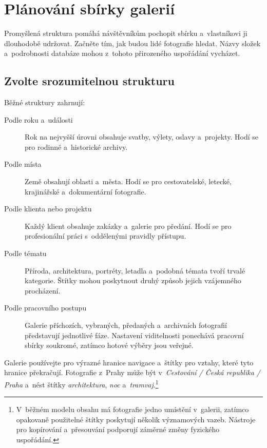 \documentclass[11pt,a4paper]{article}
\begin{document}
\section{Plánování sbírky galerií}
\label{sec:planning}

Promyšlená struktura pomáhá návštěvníkům pochopit sbírku a~vlastníkovi ji
dlouhodobě udržovat. Začněte tím, jak budou lidé fotografie hledat. Názvy složek
a~podrobnosti databáze mohou z~tohoto přirozeného uspořádání vycházet.

\subsection{Zvolte srozumitelnou strukturu}

Běžné struktury zahrnují:

\begin{description}
  \item[Podle roku a~události] Rok na nejvyšší úrovni obsahuje svatby, výlety,
  oslavy a~projekty. Hodí se pro rodinné a~historické archivy.
  \item[Podle místa] Země obsahují oblasti a~města. Hodí se pro cestovatelské,
  letecké, krajinářské a~dokumentární fotografie.
  \item[Podle klienta nebo projektu] Každý klient obsahuje zakázky a~galerie pro
  předání. Hodí se pro profesionální práci s~oddělenými pravidly přístupu.
  \item[Podle tématu] Příroda, architektura, portréty, letadla a~podobná témata
  tvoří trvalé kategorie. Štítky mohou poskytnout druhý způsob jejich vzájemného
  procházení.
  \item[Podle pracovního postupu] Galerie příchozích, vybraných, předaných
  a~archivních fotografií představují jednotlivé fáze. Nastavení viditelnosti
  ponechává pracovní sbírky soukromé, zatímco hotové výběry jsou veřejné.
\end{description}

Galerie používejte pro výrazné hranice navigace a~štítky pro vztahy, které tyto
hranice překračují. Fotografie z~Prahy může být v~\emph{Cestování / Česká
republika / Praha} a~nést štítky \emph{architektura}, \emph{noc}
a~\emph{tramvaj}.\footnote{V~běžném modelu obsahu má fotografie jedno umístění
v~galerii, zatímco opakovaně použitelné štítky poskytují několik významových
vazeb. Nástroje pro kopírování a~přesouvání podporují záměrné změny fyzického
uspořádání.}
\end{document}
